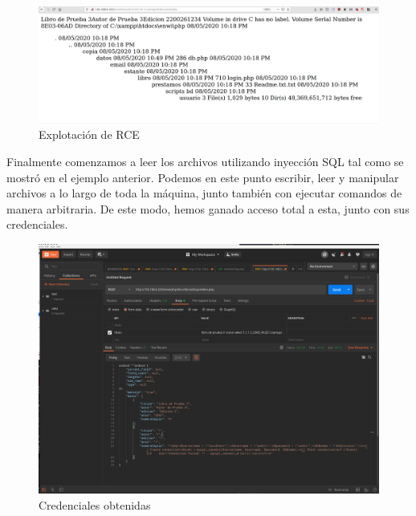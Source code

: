 \begin{figure}
	\centering
	\includegraphics[width=.9\textwidth]{fragments/pentest/pen5.png}
    \caption{ Explotación  de RCE }
\end{figure}

Finalmente comenzamos a leer los archivos utilizando inyección SQL tal como se mostró en el ejemplo anterior. Podemos en este punto escribir, leer y manipular archivos a lo largo de toda la máquina, junto también con ejecutar comandos de manera arbitraria. De este modo, hemos ganado acceso total a esta, junto con sus credenciales.

\begin{figure}
	\centering
	\includegraphics[width=.9\textwidth]{fragments/pentest/pen6.png}
    \caption{ Credenciales obtenidas }
\end{figure}